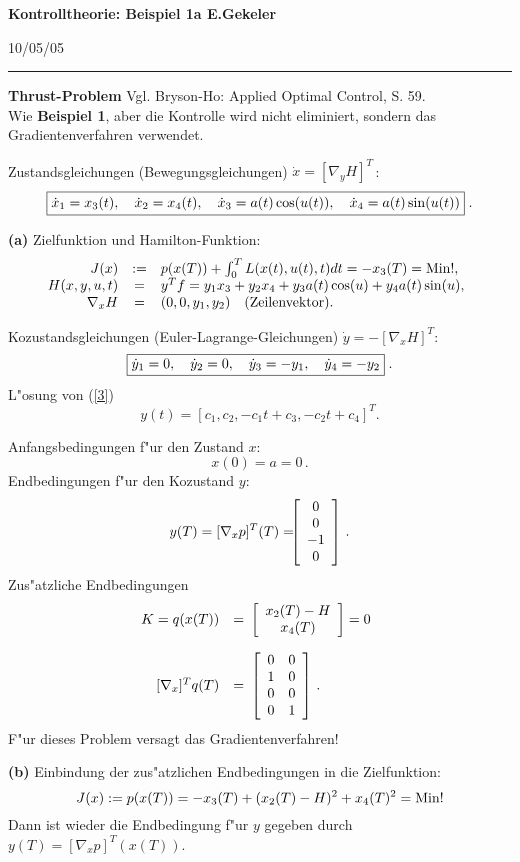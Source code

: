\documentclass[12pt,a4paper,twoside,leqno]{article}
\newcommand{\Release}{10/05/05} %
\begin{document}
{\large\bf Kontrolltheorie: Beispiel 1a \hfill E.Gekeler}
\par
\vspace{-0.5ex}
\hfill{\footnotesize\Release\ }
\par\hrule\par\vspace{2ex}
{\bf Thrust-Problem}
Vgl. {\sc Bryson-Ho}: Applied Optimal Control, S. 59.\\
Wie {\bf Beispiel 1}, aber die Kontrolle wird nicht eliminiert, sondern
das Gradientenverfahren verwendet.

Zustandsgleichungen (Bewegungsgleichungen) $\dot{x} = [\nabla_y H]^T$\,:
\begin{equation} \label{1}
\fbox{$
\dot{x}_1 = x_3(t), \quad
\dot{x}_2 = x_4(t), \quad
\dot{x}_3 = a(t) \cos(u(t)), \quad
\dot{x}_4 = a(t) \sin(u(t))
$}\; .
\end{equation}

{\bf (a)} Zielfunktion und {\sc Hamilton}-Funktion:
\begin{equation} \label{2}
\ba{.}{rcl}
J(x) &:=& p(x(T)) + \int_0^TL(x(t),u(t),t)dt = -x_3(T)  = \Min !,\\
H(x,y,u,t) &=&  y^Tf = y_1x_3 + y_2x_4 + y_3a(t)\cos(u) + y_4a(t)\sin(u),\\
\nabla_x H &=& (0,0,y_1,y_2)\quad \mbox{(Zeilenvektor)}.
\ea{.}
\end{equation}

Kozustandsgleichungen ({\sc Euler-Lagrange}-Gleichungen) $\dot{y} = -
[\nabla_x H]^T$:
\begin{equation} \label{3}
\fbox{$
\dot{y}_1 = 0,\quad
\dot{y}_2 = 0,\quad
\dot{y}_3 = - y_1,\quad
\dot{y}_4 = - y_2
$}\; .
\end{equation}
L"osung von (\ref{3})
\[
y(t) = [c_1,c_2,-c_1t + c_3,-c_2t + c_4]^T.
\]
\par
\vspace{1mm}
Anfangsbedingungen f"ur den Zustand $x$:
\[
x(0) = a = 0\,.
\]
Endbedingungen f"ur den Kozustand $y$:
\[
y(T) = [\nabla_xp]^T(T) = \ba{[}{c}0\\0\\-1\\0\ea{]}\, .
\]
Zus"atzliche Endbedingungen
\[
\ba{.}{rcl}
K = q(x(T)) &=& \ba{[}{c}x_2(T) - H\\x_4(T)\ea{]} = 0\\[6mm]
[\nabla_x]^Tq(T) &=& \ba{[}{cc} 0 & 0\\1 & 0\\0 & 0\\0 & 1\ea{]}\, .
\ea{.}
\]
F"ur dieses Problem versagt das Gradientenverfahren!
\par
\vspace{1mm}
{\bf (b)} Einbindung der zus"atzlichen Endbedingungen in die Zielfunktion:
\[
J(x) := p(x(T))= -x_3(T) + (x_2(T) - H)^2 + x_4(T)^2 = \Min !
\]
Dann ist wieder die Endbedingung f"ur $y$ gegeben durch
$y(T) = [\nabla_xp]^T(x(T))$.
\end{document}

